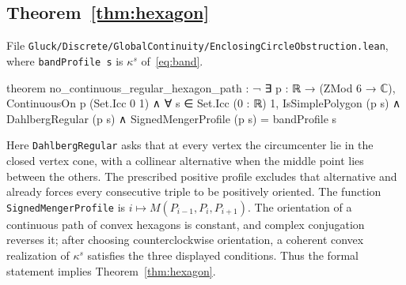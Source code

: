 \subsection*{Theorem~\ref{thm:hexagon}}
File \nolinkurl{Gluck/Discrete/GlobalContinuity/EnclosingCircleObstruction.lean},
where \texttt{bandProfile s} is $\kappa^s$ of~\eqref{eq:band}.
\begin{leancode}
theorem no_continuous_regular_hexagon_path :
    ¬ ∃ p : ℝ → (ZMod 6 → ℂ), ContinuousOn p (Set.Icc 0 1) ∧
      ∀ s ∈ Set.Icc (0 : ℝ) 1,
        IsSimplePolygon (p s) ∧ DahlbergRegular (p s) ∧
        SignedMengerProfile (p s) = bandProfile s
\end{leancode}
Here \texttt{DahlbergRegular} asks that at every vertex the circumcenter lie
in the closed vertex cone, with a collinear alternative when the middle
point lies between the others. The prescribed positive profile excludes
that alternative and already forces every consecutive triple to be positively
oriented. The function \texttt{SignedMengerProfile} is
$i\mapsto M(P_{i-1},P_i,P_{i+1})$. The orientation of a continuous path of
convex hexagons is constant, and complex conjugation reverses it; after
choosing counterclockwise orientation, a coherent convex realization of
$\kappa^s$ satisfies the three displayed conditions. Thus the formal statement
implies Theorem~\ref{thm:hexagon}.
\par\endgroup
